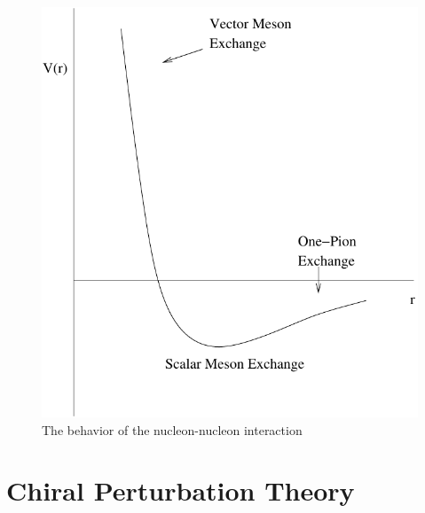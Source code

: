 \begin{figure}[htp]
\centering
\includegraphics[scale=0.50]{nucleon-nucleon_pot}
\caption{The behavior of the nucleon-nucleon interaction}
\label{nucleon_pot}
\end{figure}



\section{Chiral Perturbation Theory}

